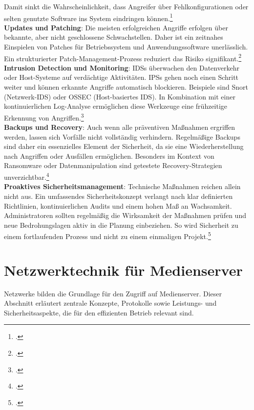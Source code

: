 \documentclass[12pt,a4paper]{report}
\begin{document}
  Damit sinkt die Wahrscheinlichkeit, dass Angreifer über Fehlkonfigurationen oder selten genutzte Software ins System eindringen können.\footcite[Vgl.][S.~902]{nemeth_unixlinux}
  \\  
  \newline
  \textbf{Updates und Patching}:  
  Die meisten erfolgreichen Angriffe erfolgen über bekannte, aber nicht geschlossene Schwachstellen. 
  Daher ist ein zeitnahes Einspielen von Patches für Betriebssystem und Anwendungssoftware unerlässlich. 
  Ein strukturierter Patch-Management-Prozess reduziert das Risiko signifikant.\footcite[Vgl.][S.~901]{nemeth_unixlinux}  
  \\
  \newline
  \textbf{Intrusion Detection und Monitoring}:  
  \acp{IDS} überwachen den Datenverkehr oder Host-Systeme auf verdächtige Aktivitäten. 
  \acp{IPS} gehen noch einen Schritt weiter und können erkannte Angriffe automatisch blockieren. 
  Beispiele sind Snort (Netzwerk-\ac{IDS}) oder OSSEC (Host-basiertes \ac{IDS}). 
  In Kombination mit einer kontinuierlichen Log-Analyse ermöglichen diese Werkzeuge eine frühzeitige Erkennung von Angriffen.\footcite[Vgl.][S.~918~ff.]{nemeth_unixlinux} 
  \\ 
  \newline
  \textbf{Backups und Recovery}:  
  Auch wenn alle präventiven Maßnahmen ergriffen werden, lassen sich Vorfälle nicht vollständig verhindern. 
  Regelmäßige Backups sind daher ein essenzielles Element der Sicherheit, da sie eine Wiederherstellung nach Angriffen oder Ausfällen ermöglichen. 
  Besonders im Kontext von Ransomware oder Datenmanipulation sind getestete Recovery-Strategien unverzichtbar.\footcite[Vgl.][S.~903]{nemeth_unixlinux} 
  \\ 
  \newline
  \textbf{Proaktives Sicherheitsmanagement}:  
  Technische Maßnahmen reichen allein nicht aus. 
  Ein umfassendes Sicherheitskonzept verlangt nach klar definierten Richtlinien, kontinuierlichen Audits und einem hohen Maß an Wachsamkeit. 
  Administratoren sollten regelmäßig die Wirksamkeit der Maßnahmen prüfen und neue Bedrohungslagen aktiv in die Planung einbeziehen. 
  So wird Sicherheit zu einem fortlaufenden Prozess und nicht zu einem einmaligen Projekt.\footcite[Vgl.][S.~901, S.~905]{nemeth_unixlinux}   

\section{Netzwerktechnik für Medienserver}
Netzwerke bilden die Grundlage für den Zugriff auf Medienserver. 
Dieser Abschnitt erläutert zentrale Konzepte, Protokolle sowie Leistungs- und Sicherheitsaspekte, 
die für den effizienten Betrieb relevant sind.  
\end{document}
